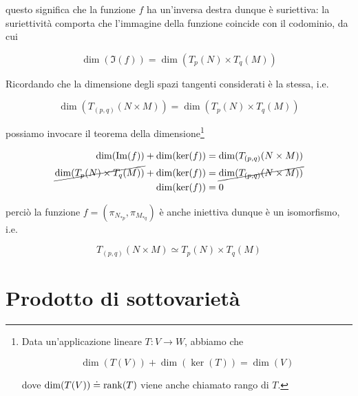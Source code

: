 questo significa che la funzione $ f $ ha un'inversa destra dunque è suriettiva: la suriettività comporta che l'immagine della funzione coincide con il codominio, da cui

\begin{equation}
	\dim(\Im(f)) = \dim(T_{p}(N) \times T_{q}(M))
\end{equation}

Ricordando che la dimensione degli spazi tangenti considerati è la stessa, i.e.

\begin{equation}
	\dim(T_{(p,q)}(N \times M)) = \dim(T_{p}(N) \times T_{q}(M))
\end{equation}

possiamo invocare il teorema della dimensione\footnote{%
	Data un'applicazione lineare $ T : V \to W $, abbiamo che
	
	\begin{equation*}
		\dim(T(V)) + \dim(\ker(T)) = \dim(V)
	\end{equation*}
	
	dove $ \dim(T(V)) \doteq \rank(T) $ viene anche chiamato rango di $ T $.%
}

\begin{align}
	\begin{split}
		\dim(\Im(f)) + \dim(\ker(f)) &= \dim(T_{(p,q)}(N \times M))\\
		\cancel{ \dim(T_{p}(N) \times T_{q}(M)) } + \dim(\ker(f)) &= \cancel{ \dim(T_{(p,q)}(N \times M)) }\\
		\dim(\ker(f)) &= 0
	\end{split}
\end{align}

perciò la funzione $ f = (\pi_{N_{*p}},\pi_{M_{*q}}) $ è anche iniettiva dunque è un isomorfismo, i.e.

\begin{equation}
	T_{(p,q)}(N \times M) \simeq T_{p}(N) \times T_{q}(M)
\end{equation}
 



%

\newpage

%

\section{Prodotto di sottovarietà}\label{es2-12}

